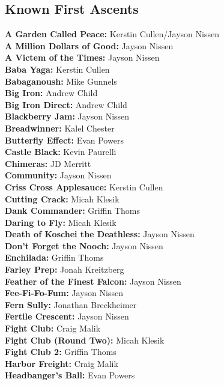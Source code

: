 \begin{flushleft}
\section{Known First Ascents}
\textbf{A Garden Called Peace:} Kerstin Cullen/Jayson Nissen\\
\textbf{A Million Dollars of Good:} Jayson Nissen\\
\textbf{A Victem of the Times:} Jayson Nissen\\
\textbf{Baba Yaga:} Kerstin Cullen\\
\textbf{Babaganoush:} Mike Gunnels\\
\textbf{Big Iron:} Andrew Child\\
\textbf{Big Iron Direct:} Andrew Child\\
\textbf{Blackberry Jam:} Jayson Nissen\\
\textbf{Breadwinner:} Kalel Chester\\
\textbf{Butterfly Effect:} Evan Powers\\
\textbf{Castle Black:} Kevin Paurelli\\
\textbf{Chimeras:} JD Merritt\\
\textbf{Community:} Jayson Nissen\\
\textbf{Criss Cross Applesauce:} Kerstin Cullen\\
\textbf{Cutting Crack:} Micah Klesik\\
\textbf{Dank Commander:} Griffin Thoms\\
\textbf{Daring to Fly:} Micah Klesik\\
\textbf{Death of Koschei the Deathless:} Jayson Nissen\\
\textbf{Don't Forget the Nooch:} Jayson Nissen\\
\textbf{Enchilada:} Griffin Thoms\\
\textbf{Farley Prep:} Jonah Kreitzberg\\
\textbf{Feather of the Finest Falcon:} Jayson Nissen\\
\textbf{Fee-Fi-Fo-Fum:} Jayson Nissen\\
\textbf{Fern Sully:} Jonathan Breckheimer\\
\textbf{Fertile Crescent:} Jayson Nissen\\
\textbf{Fight Club:} Craig Malik\\
\textbf{Fight Club (Round Two):} Micah Klesik\\
\textbf{Fight Club 2:} Griffin Thoms\\
\textbf{Harbor Freight:} Craig Malik\\
\textbf{Headbanger's Ball:} Evan Powers\\

\end{flushleft}
